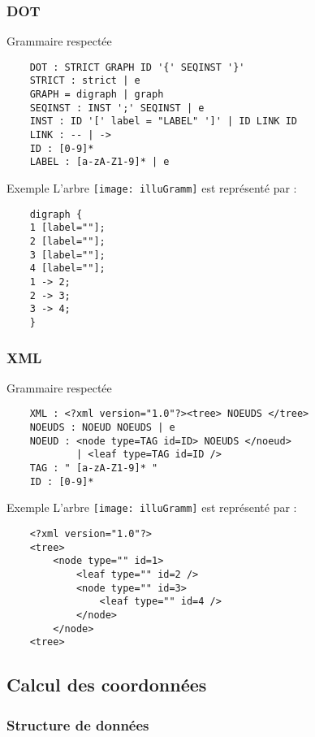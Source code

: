 \begin{frame}
    \frametitle{DOT}
    \begin{block}{Grammaire respectée}
    \begin{verbatim}
    DOT : STRICT GRAPH ID '{' SEQINST '}'
    STRICT : strict | e
    GRAPH = digraph | graph
    SEQINST : INST ';' SEQINST | e
    INST : ID '[' label = "LABEL" ']' | ID LINK ID
    LINK : -- | ->
    ID : [0-9]*
    LABEL : [a-zA-Z1-9]* | e
    \end{verbatim}
    \end{block}
    \begin{exampleblock}{Exemple}
    L'arbre \texttt{[image: illuGramm]} est représenté par :
    \begin{verbatim}
    digraph {
    1 [label=""];
    2 [label=""];
    3 [label=""];
    4 [label=""];
    1 -> 2;
    2 -> 3;
    3 -> 4;
    }
    \end{verbatim}
    \end{exampleblock}
\end{frame}

\begin{frame}
    \frametitle{XML}
    \begin{block}{Grammaire respectée}
    \begin{verbatim}
    XML : <?xml version="1.0"?><tree> NOEUDS </tree>
    NOEUDS : NOEUD NOEUDS | e
    NOEUD : <node type=TAG id=ID> NOEUDS </noeud>
            | <leaf type=TAG id=ID />
    TAG : " [a-zA-Z1-9]* "
    ID : [0-9]*
    \end{verbatim}
    \end{block}
    \begin{exampleblock}{Exemple}
    L'arbre \texttt{[image: illuGramm]} est représenté par :
    \begin{verbatim}
    <?xml version="1.0"?>
    <tree>
        <node type="" id=1>
            <leaf type="" id=2 />
            <node type="" id=3>
                <leaf type="" id=4 />
            </node>
    	</node>
    <tree>
    \end{verbatim}
    \end{exampleblock}
\end{frame}

\subsection{Calcul des coordonnées}

\begin{frame}
	\frametitle{Structure de données}
	
\end{frame}

